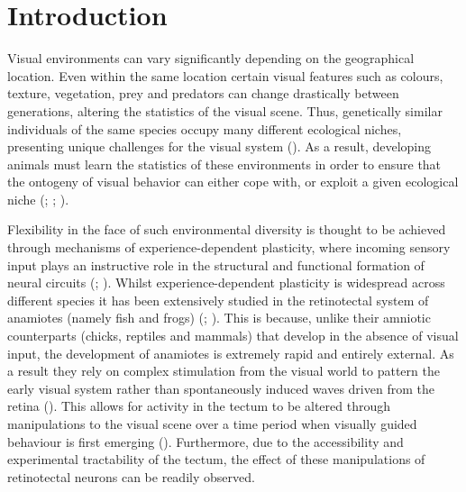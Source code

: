 \section{Introduction}
Visual environments can vary significantly depending on the geographical location. Even within the same location certain visual features such as colours, texture, vegetation, prey and predators can change drastically between generations, altering the statistics of the visual scene. Thus, genetically similar individuals of the same species occupy many different ecological niches, presenting unique challenges for the visual system (\cite{Engeszer2007ZebrafishField}). As a result, developing animals must learn the statistics of these environments in order to ensure that the ontogeny of visual behavior can either cope with, or exploit a given ecological niche (\cite{Wong2015BehavioralEnvironments}; \cite{Harer2019RevertingFish}; \cite{Gilmour2018PlasticityConditions}).

Flexibility in the face of such environmental diversity is thought to be achieved through mechanisms of experience-dependent plasticity, where incoming sensory input plays an instructive role in the structural and functional formation of neural circuits (\cite{Fox2005ReviewSystems}; \cite{Hooks2007CriticalPlasticity.}). Whilst experience-dependent plasticity is widespread across different species it has been extensively studied in the retinotectal system of anamiotes (namely fish and frogs) (\cite{Ruthazer2010LearningFunction}; \cite{Pratt2016AnDevelopment}). This is because, unlike their amniotic counterparts (chicks, reptiles and mammals) that develop in the absence of visual input, the development of anamiotes is extremely rapid and entirely external. As a result they rely on complex stimulation from the visual world to pattern the early visual system rather than spontaneously induced waves driven from the retina (\cite{Pratt2016AnDevelopment}).
This allows for activity in the tectum to be altered through manipulations to the visual scene over a time period when visually guided behaviour is first emerging (\cite{Ruthazer2004InsightsPerspective}). Furthermore, due to the accessibility and experimental tractability of the tectum, the effect of these manipulations of retinotectal neurons can be readily observed.

